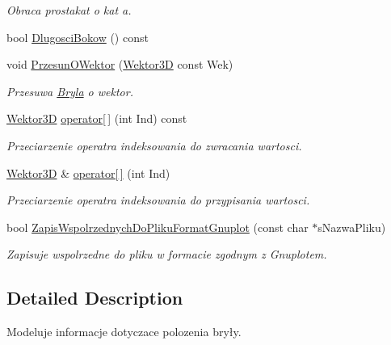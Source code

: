 \begin{DoxyCompactItemize}
\begin{DoxyCompactList}\small\item\em Obraca prostakat o kat a. \end{DoxyCompactList}\item 
bool \hyperlink{class_bryla_a0b957f6ac851edf5ebbbcb4d83c0c001}{Dlugosci\+Bokow} () const 
\item 
void \hyperlink{class_bryla_a4e6d1788b5a1bc0acb5d5f7f19d86a63}{Przesun\+O\+Wektor} (\hyperlink{class_wektor3_d}{Wektor3\+D} const Wek)
\begin{DoxyCompactList}\small\item\em Przesuwa \hyperlink{class_bryla}{Bryla} o wektor. \end{DoxyCompactList}\item 
\hypertarget{class_bryla_a8b75eb3c432ca41f5318ae510183eeba}{\hyperlink{class_wektor3_d}{Wektor3\+D} \hyperlink{class_bryla_a8b75eb3c432ca41f5318ae510183eeba}{operator\mbox{[}$\,$\mbox{]}} (int Ind) const }\label{class_bryla_a8b75eb3c432ca41f5318ae510183eeba}

\begin{DoxyCompactList}\small\item\em Przeciarzenie operatra indeksowania do zwracania wartosci. \end{DoxyCompactList}\item 
\hypertarget{class_bryla_a3f6e56fc65d8d55ed112b0b1c8e90c3b}{\hyperlink{class_wektor3_d}{Wektor3\+D} \& \hyperlink{class_bryla_a3f6e56fc65d8d55ed112b0b1c8e90c3b}{operator\mbox{[}$\,$\mbox{]}} (int Ind)}\label{class_bryla_a3f6e56fc65d8d55ed112b0b1c8e90c3b}

\begin{DoxyCompactList}\small\item\em Przeciarzenie operatra indeksowania do przypisania wartosci. \end{DoxyCompactList}\item 
bool \hyperlink{class_bryla_a69540cc627492b27fc0fb7bb1848fd6a}{Zapis\+Wspolrzednych\+Do\+Pliku\+Format\+Gnuplot} (const char $\ast$s\+Nazwa\+Pliku)
\begin{DoxyCompactList}\small\item\em Zapisuje wspolrzedne do pliku w formacie zgodnym z Gnuplotem. \end{DoxyCompactList}\end{DoxyCompactItemize}


\subsection{Detailed Description}
Modeluje informacje dotyczace polozenia bryły. 

